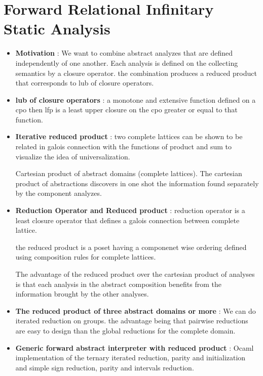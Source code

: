 \chapter{Forward Relational Infinitary Static Analysis}

\begin{itemize}
	\item{\textbf{Motivation} : We want to combine abstract analyzes that are  defined independently of one another. Each analysis is defined on the collecting semantics by a closure operator. the combination produces a reduced product that corresponds to lub of closure operators.
	}

	\item{\textbf{lub of closure operators} : a monotone and extensive function defined on a cpo then lfp is a least upper closure on the cpo greater or equal to that function.
	}

	\item{\textbf{Iterative reduced product} : two complete lattices can be shown to be related in galois connection with the functions of product and sum to visualize the idea of universalization. 

	Cartesian product of abstract domains (complete lattices). The cartesian product of abstractions discovers in one shot the information found separately by the component analyzes.
	}

	\item{\textbf{Reduction Operator and Reduced product} : reduction operator is a least closure operator that defines a galois connection between complete lattice.

	the reduced product is a poset having a componenet wise ordering defined using composition rules for complete lattices.

	The advantage of the reduced product over the cartesian product of analyses is that each analysis in the abstract composition benefits from the information brought by the other analyses.
	}

	\item{\textbf{The reduced product of three abstract domains or more} : We can do iterated reduction on groups. the advantage being that pairwise reductions are easy to design than the global reductions for the complete domain.
	}

	\item{\textbf{Generic forward abstract interpreter with reduced product} :
	Ocaml implementation of the  ternary iterated reduction, parity and initialization and simple sign reduction, parity and intervals reduction.
	}


\end{itemize}
